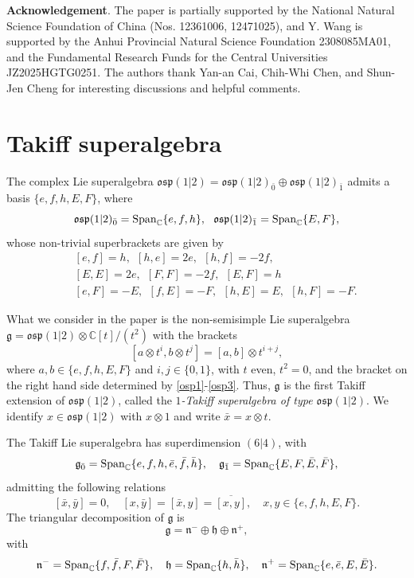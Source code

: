 \documentclass[a4paper,10pt]{article}
\theoremstyle{definition}
\theoremstyle{plain}
\theoremstyle{remark}
\theoremstyle{mystyle}
\numberwithin{equation}{section}
\begin{document}
\medskip
\noindent
{\bf Acknowledgement}. The paper is partially supported by the National Natural Science Foundation of China (Nos. 12361006, 12471025), and Y. Wang is supported by the Anhui Provincial Natural Science Foundation 2308085MA01, and the Fundamental Research Funds for the Central Universities JZ2025HGTG0251. The authors thank Yan-an Cai, Chih-Whi Chen, and Shun-Jen Cheng for interesting discussions and helpful comments.



\section{Takiff superalgebra}\label{s2}
The complex Lie superalgebra $\mathfrak{osp}(1|2)=\mathfrak{osp}(1|2)_{\bar{0}}\oplus\mathfrak{osp}(1|2)_{\bar{1}}$ admits a basis $\{e,f,h,E,F\}$, where
$$\mathfrak{osp}(1|2)_{\bar{0}}={\rm Span}_{\mathbb{C}}\{e,f,h\},\ \ 
\mathfrak{osp}(1|2)_{\bar{1}}={\rm Span}_{\mathbb{C}}\{E,F\},$$
whose non-trivial superbrackets are given by
\begin{eqnarray}
\label{osp1}&&[e,f]=h,\ \ [h,e]=2e,\ \ [h,f]=-2f,\\
\label{osp2}&&[E,E]=2e,\ \ [F,F]=-2f,\ \ [E,F]=h\\
\label{osp3}&&[e,F]=-E,\ \ [f,E]=-F,\ \ [h,E]=E,\ \ [h,F]=-F.
\end{eqnarray}

What we consider in the paper is the non-semisimple Lie superalgebra $\mathfrak{g}=\mathfrak{osp}(1|2)\otimes\mathbb{C}[t]/(t^2)$ with the brackets
 $$[a\otimes t^i,b\otimes t^j]=[a,b]\otimes t^{i+j},$$
 where $a,b\in\{e,f,h,E,F\}$ and $i,j\in\{0,1\}$, with $t$ even, $t^2=0$, and the bracket on the right hand side determined by \eqref{osp1}-\eqref{osp3}. Thus, $\mathfrak{g}$ is the first Takiff extension of $\mathfrak{osp}(1|2)$, called the {\it $1$-Takiff superalgebra of type $\mathfrak{osp}(1|2)$}. We identify $x\in\mathfrak{osp}(1|2)$ with $x\otimes 1$ and write $\bar x=x\otimes t$.
 
The Takiff Lie superalgebra has superdimension $(6|4)$, with 
 $$\mathfrak{g}_{\bar{0}}={\rm Span}_{\mathbb{C}}\{e,f,h,\bar{e},\bar{f},\bar{h}\},\quad \mathfrak{g}_{\bar{1}}={\rm Span}_{\mathbb{C}}\{E,F,\bar{E},\bar{F}\},$$
admitting the following relations
$$[\bar{x},\bar{y}]=0,\quad [x,\bar{y}]=[\bar{x},y]=\overline{[x,y]},\quad x,y\in\{e,f,h,E,F\}.$$
The triangular decomposition of $\mathfrak{g}$ is 
$$\mathfrak{g}=\mathfrak{n}^{-}\oplus\mathfrak{h}\oplus\mathfrak{n}^{+},$$
with 
$$\mathfrak{n}^{-}={\rm Span}_{\mathbb{C}}\{f,\bar{f},F,\bar{F}\} ,\quad\mathfrak{h}={\rm Span}_{\mathbb{C}}\{h,\bar{h}\},\quad\mathfrak{n}^{+}={\rm Span}_{\mathbb{C}}\{e,\bar{e},E,\bar{E}\}.$$
\end{document}
